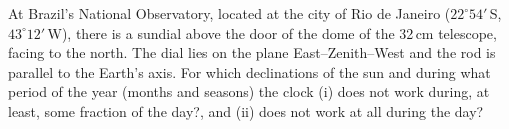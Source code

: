 At Brazil's National Observatory, located at the city of Rio de Janeiro
($22^\circ 54'$\,S, $43^\circ 12'$\,W), there is a sundial above the door of
the dome of the 32\,cm telescope, facing to the north. The dial lies on the
plane East--Zenith--West and the rod is parallel to the Earth's axis. For
which declinations of the sun and during what period of the year (months and
seasons) the clock (i) does not work during, at least, some fraction of the
day?, and (ii) does not work at all during the day?
